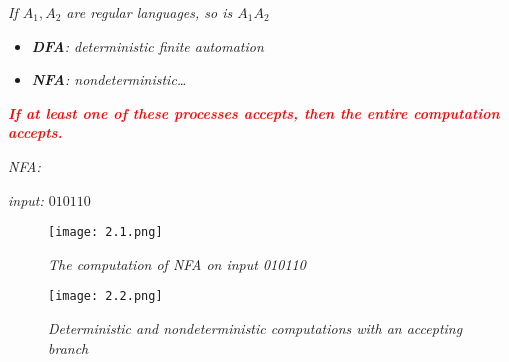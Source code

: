 \documentclass{article}
\begin{document}
\begin{thm}
    \textit{If $A_1,A_2$ are regular languages, so is $A_1A_2$}

    \begin{itemize}
        \item \textit{\textbf{DFA}: deterministic finite automation}
        \item \textit{\textbf{NFA}: nondeterministic\dots}
    \end{itemize}
    
    \textcolor{red}{\textbf{\textit{If at least one of these processes accepts, then the entire computation accepts.}}}
    \begin{example}
        \textit{NFA:\\}

        \textit{input: $010110$\\}
        \begin{figure}[htbp]
            \centering \texttt{[image: 2.1.png]}
            \caption{\textit{The computation of NFA on input 010110}}
        \end{figure}

        \begin{figure}
            \centering \texttt{[image: 2.2.png]}
            \caption{\textit{Deterministic and nondeterministic computations with an accepting branch}}
        \end{figure}
          
    \end{example}
\end{thm}
\end{document}

